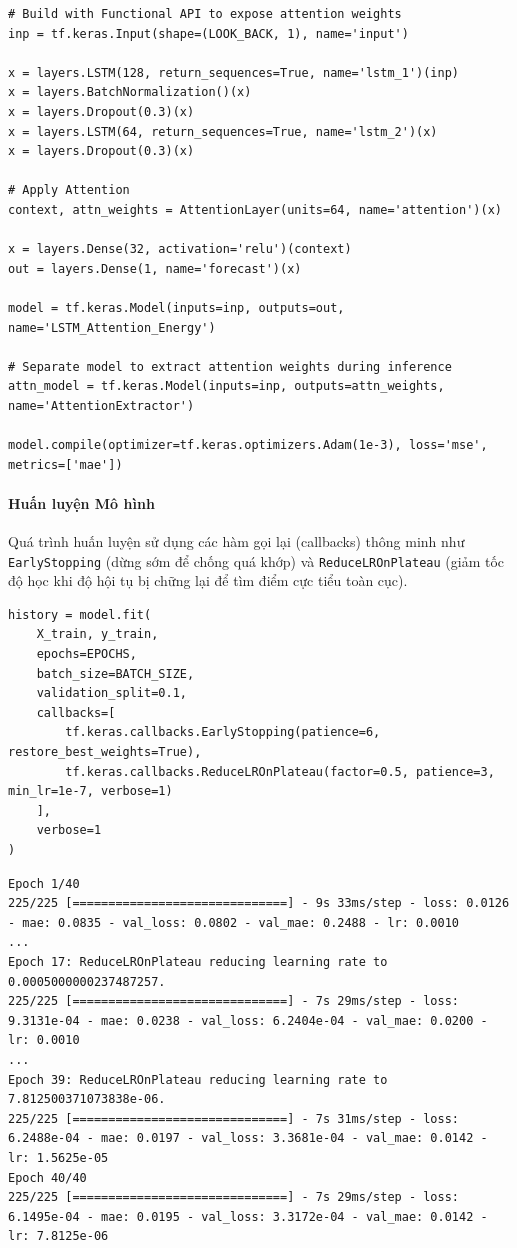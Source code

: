 \begin{lstlisting}[style=pythoncode, caption={Kiến trúc Functional API ghép nối LSTM với Attention}]
# Build with Functional API to expose attention weights
inp = tf.keras.Input(shape=(LOOK_BACK, 1), name='input')

x = layers.LSTM(128, return_sequences=True, name='lstm_1')(inp)
x = layers.BatchNormalization()(x)
x = layers.Dropout(0.3)(x)
x = layers.LSTM(64, return_sequences=True, name='lstm_2')(x)
x = layers.Dropout(0.3)(x)

# Apply Attention
context, attn_weights = AttentionLayer(units=64, name='attention')(x)

x = layers.Dense(32, activation='relu')(context)
out = layers.Dense(1, name='forecast')(x)

model = tf.keras.Model(inputs=inp, outputs=out, name='LSTM_Attention_Energy')

# Separate model to extract attention weights during inference
attn_model = tf.keras.Model(inputs=inp, outputs=attn_weights, name='AttentionExtractor')

model.compile(optimizer=tf.keras.optimizers.Adam(1e-3), loss='mse', metrics=['mae'])
\end{lstlisting}

\paragraph{Huấn luyện Mô hình} \hfill\mbox{}

Quá trình huấn luyện sử dụng các hàm gọi lại (callbacks) thông minh như \texttt{EarlyStopping} (dừng sớm để chống quá khớp) và \texttt{ReduceLROnPlateau} (giảm tốc độ học khi độ hội tụ bị chững lại để tìm điểm cực tiểu toàn cục).

\begin{lstlisting}[style=pythoncode, caption={Huấn luyện mô hình với Callbacks}]
history = model.fit(
    X_train, y_train,
    epochs=EPOCHS,
    batch_size=BATCH_SIZE,
    validation_split=0.1,
    callbacks=[
        tf.keras.callbacks.EarlyStopping(patience=6, restore_best_weights=True),
        tf.keras.callbacks.ReduceLROnPlateau(factor=0.5, patience=3, min_lr=1e-7, verbose=1)
    ],
    verbose=1
)
\end{lstlisting}

\begin{lstlisting}[style=consoleoutput, caption={Output: Quá trình Huấn luyện (Training Log)}]
Epoch 1/40
225/225 [==============================] - 9s 33ms/step - loss: 0.0126 - mae: 0.0835 - val_loss: 0.0802 - val_mae: 0.2488 - lr: 0.0010
...
Epoch 17: ReduceLROnPlateau reducing learning rate to 0.0005000000237487257.
225/225 [==============================] - 7s 29ms/step - loss: 9.3131e-04 - mae: 0.0238 - val_loss: 6.2404e-04 - val_mae: 0.0200 - lr: 0.0010
...
Epoch 39: ReduceLROnPlateau reducing learning rate to 7.812500371073838e-06.
225/225 [==============================] - 7s 31ms/step - loss: 6.2488e-04 - mae: 0.0197 - val_loss: 3.3681e-04 - val_mae: 0.0142 - lr: 1.5625e-05
Epoch 40/40
225/225 [==============================] - 7s 29ms/step - loss: 6.1495e-04 - mae: 0.0195 - val_loss: 3.3172e-04 - val_mae: 0.0142 - lr: 7.8125e-06
\end{lstlisting}

